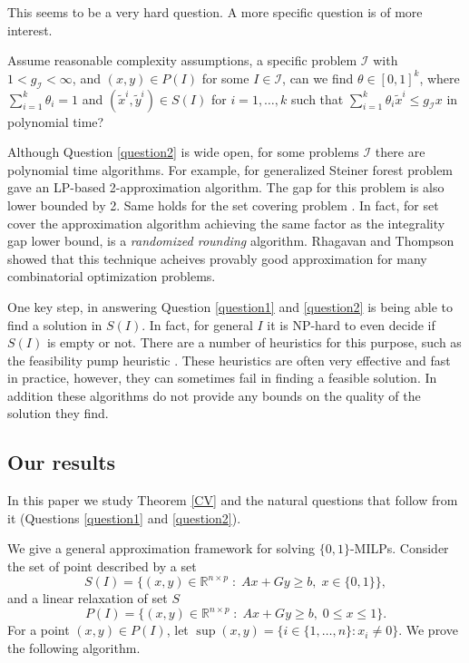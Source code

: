 This seems to be a very hard question. A more specific question is of more interest.

\begin{question}\label{question2}
	Assume reasonable complexity assumptions, a specific problem $\mathcal{I}$ with  $1<g_{\mathcal{I}}<\infty$, and $(x,y)\in P(I)$ for some $I\in \mathcal{I}$, can we find $\theta \in [0,1]^k$, where $\sum_{i=1}^{k}\theta_i =1$ and $(\tilde{x}^i,\tilde{y}^i)\in S(I)$ for $i=1,\ldots,k$ such that $\sum_{i=1}^{k}\theta_i \tilde{x}^i\leq g_{\mathcal{I}}x$ in polynomial time?
\end{question}
Although Question \ref{question2} is wide open, for some problems $\mathcal{I}$ there are polynomial time algorithms. For example, for generalized Steiner forest problem \cite{jain} gave an LP-based 2-approximation algorithm. The gap for this problem is also lower bounded by 2. Same holds for the set covering problem \cite{randomizedrounding}. In fact, for set cover the approximation algorithm achieving the same factor as the integrality gap lower bound, is a \textit{randomized rounding} algorithm. Rhagavan and Thompson \cite{randomizedrounding} showed that this technique acheives provably good approximation for many combinatorial optimization problems.  

One key step, in answering Question \ref{question1} and \ref{question2} is being able to find a solution in $S(I)$. In fact, for general $I$ it is NP-hard to even decide if $S(I)$ is empty or not. There are a number of heuristics for this purpose, such as the feasibility pump heuristic \cite{fp1,fp2}. These heuristics are often very effective and fast in practice, however, they can sometimes fail in finding a feasible solution. In addition these algorithms do not provide any bounds on the quality of the solution they find.










\subsection{Our results}

In this paper we study Theorem \ref{CV} and the natural questions that follow from it (Questions \ref{question1} and \ref{question2}).


 We give a general approximation framework for solving $\{0,1\}$-MILPs.  Consider the set of point described by a set 
\begin{equation}
S(I)= \{(x,y)\in \mathbb{R}^{n\times p}\;:\; Ax+Gy\geq b,\; x\in \{0,1\}\},  \label{S'}
\end{equation}
and a linear relaxation of set $S$
\begin{equation}
P(I) = \{(x,y)\in \mathbb{R}^{n\times p}\;:\; Ax+Gy\geq b,\; 0 \leq x\leq 1\}. \label{P'}
\end{equation}
For a point $(x,y)\in P(I)$, let $\sup(x,y)= \{i \in \{1,\ldots,n\}: x_i \neq 0\}$.  We prove the following algorithm.

